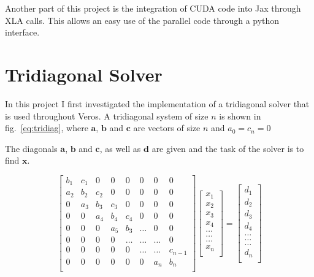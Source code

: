 \documentclass[a4paper,oneside]{memoir}
\begin{document}
Another part of this project is the integration of CUDA code into Jax through XLA calls.
This allows an easy use of the parallel code through a python interface.


\section{Tridiagonal Solver}
In this project I first investigated the implementation of a tridiagonal solver that is used throughout Veros. 
A tridiagonal system of size $n$ is shown in fig.~\ref{eq:tridiag}, where $\bm{a}$, $\bm{b}$ and $\bm{c}$ are vectors of size $n$ and $a_0 = c_n = 0$ 

The diagonals $\bm{a}$, $\bm{b}$ and $\bm{c}$, as well as $\bm{d}$ are given and the task of the solver is to find $\bm{x}$.

\begin{equation} \label{eq:tridiag}
    \begin{bmatrix}
        b_1 & c_1 & 0  & 0 & 0 & 0 & 0 & 0 \\
        a_2 & b_2 & c_2 & 0 & 0 & 0 & 0 & 0\\
        0   & a_3 & b_3 & c_3 & 0 & 0 & 0 & 0\\
        0   &  0  & a_4 & b_4 & c_4 & 0 & 0 & 0\\
        0   &  0  &  0  & a_5 & b_3 & \dots & 0  & 0\\
        0   &  0  &  0  &  0  & \dots & \dots &  \dots & 0 \\
        0   &  0  &  0  &  0  &  0  & \dots & \dots & c_{n-1}\\
        0   &  0  &  0  &  0  &  0  &  0  & a_n & b_n \\
    \end{bmatrix}
    \begin{bmatrix}
        x_1 \\
        x_2 \\
        x_3   \\
        x_4   \\
        \dots   \\
        \dots   \\
        \dots   \\
        x_n   \\
    \end{bmatrix}
     = 
     \begin{bmatrix}
        d_1 \\
        d_2 \\
        d_3   \\
        d_4   \\
        \dots   \\
        \dots   \\
        \dots   \\
        d_n   \\
    \end{bmatrix}
\end{equation}
\end{document}
